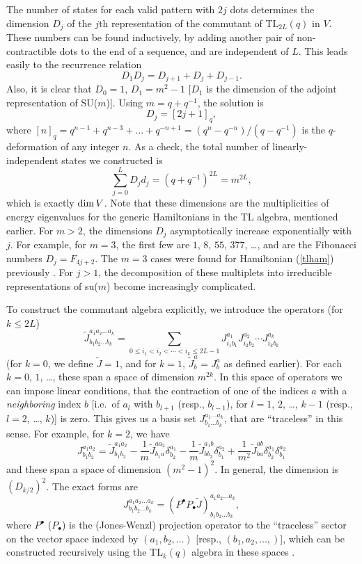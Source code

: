 \documentclass[twocolumn,floats,pra]{revtex4}
\newcommand {\be}{\begin{equation}}
\newcommand {\ee} {\end{equation}}
\begin{document}
The number of states for each valid pattern with $2j$ dots
determines the dimension $D_j$ of the $j$th representation of the
commutant of TL$_{2L}(q)$ in $V$. These numbers can be found
inductively, by adding another pair of non-contractible dots to
the end of a sequence, and are independent of $L$. This leads
easily to the recurrence relation \cite{rs}
\be%
D_1 D_j=D_{j+1}+D_j+D_{j-1}.\label{recrel}\ee%
Also, it is clear that $D_0=1$, $D_1=m^2-1$ [$D_1$ is the
dimension of the adjoint representation of SU($m$)].
Using $m=q+q^{-1}$, the solution is%
\be%
D_j=[2j+1]_q,\label{dj}\ee where
$[n]_q=q^{n-1}+q^{n-3}+\ldots+q^{-n+1}=(q^n-q^{-n})/(q-q^{-1})$ is
the $q$-deformation of any integer $n$. As a check, the total
number of linearly-independent states we constructed is%
\be%
\sum_{j=0}^{L} D_j d_j=(q+q^{-1})^{2L}=m^{2L},\ee %
which is exactly ${\rm dim\,}V$. Note that these dimensions are
the multiplicities of energy eigenvalues for the generic
Hamiltonians in the TL algebra, mentioned earlier. For $m>2$, the
dimensions $D_j$ asymptotically increase exponentially with $j$.
For example, for $m=3$, the first few are $1$, $8$, $55$, $377$,
\ldots, and are the Fibonacci numbers $D_j=F_{4j+2}$. The $m=3$
cases were found for Hamiltonian (\ref{tlham}) previously
\cite{ha}. For $j>1$, the decomposition of these multiplets into
irreducible representations of su($m$) become increasingly
complicated.


To construct the commutant algebra explicitly, we introduce the
operators (for $k\leq 2L$)%
\be%
\widetilde{J}^{a_1a_2\ldots a_k}_{b_1b_2\ldots b_k}=\sum_{0\leq
i_1<i_2<\cdots <i_k\leq 2L-1} J_{i_1 b_1}^{a_1}J_{i_2
b_2}^{a_2}\cdots J_{i_k b_k}^{a_k} \ee%
(for $k=0$, we define $\widetilde{J}=1$, and for $k=1$,
$\widetilde{J}^a_b=J^a_b$ as defined earlier). For each $k=0$,
$1$, \ldots, these span a space of dimension $m^{2k}$. In this
space of operators we can impose linear conditions, that the
contraction of one of the indices $a$ with a {\em neighboring}
index $b$ [i.e.\ of $a_l$ with $b_{l+ 1}$ (resp., $b_{l-1}$), for
$l=1$, $2$, \ldots, $k- 1$ (resp., $l=2$, \ldots, $k$)] is zero.
This gives us a basis set $J^{a_1\ldots a_k}_{b_1\ldots b_k}$,
that are ``traceless'' in this sense.
For example, for $k=2$, we have %
\be%
J^{a_1 a_2}_{b_1 b_2}=\widetilde{J}^{a_1 a_2}_{b_1 b_2}%
-\frac{1}{m}\widetilde{J}^{a a_2}_{b_1 a}\delta^{a_1}_{b_2}%
-\frac{1}{m}\widetilde{J}^{a_1b}_{b b_2} \delta^{a_2}_{b_1}%
+\frac{1}{m^2}\widetilde{J}^{a b}_{b a}\delta^{a_1}_{b_2}\delta^{a_2}_{b_1}%
\ee%
and these span a space of dimension $(m^2-1)^2$. In general, the
dimension is $(D_{k/2})^2$. The exact forms are %
\be%
J^{a_1a_2\ldots a_k}_{b_1b_2\ldots b_k}=(P^\bullet P_\bullet
\widetilde{J})^{a_1a_2\ldots a_k}_{b_1b_2\ldots b_k},\label{commdef}\ee%
where $P^\bullet$ ($P_\bullet$) is the (Jones-Wenzl) projection
operator to the ``traceless'' sector on the vector space indexed
by $(a_1,b_2,\ldots)$ [resp., $(b_1,a_2,\ldots,)$], which can be
constructed recursively using the TL$_k(q)$ algebra in these
spaces \cite{fnsww}.
\end{document}
